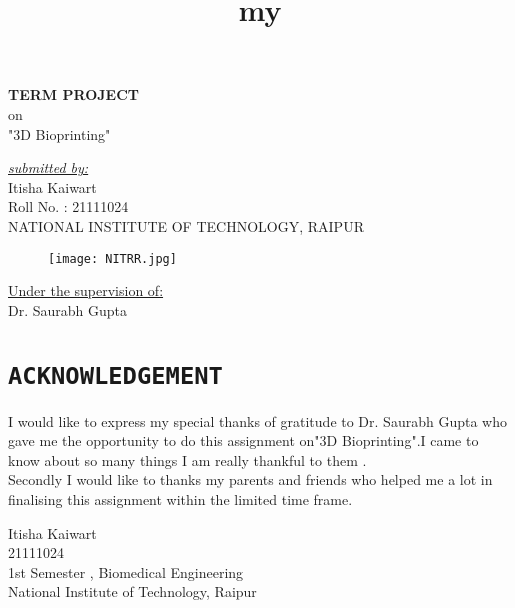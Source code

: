 \documentclass[11pt]{article}
\title{my}
\begin{document}
\centering
\huge\textbf{TERM PROJECT}\\
on\\
\Huge"3D Bioprinting"
\

\emph{\large \underline{ submitted by:}}\\
\large Itisha Kaiwart\\
\large Roll No. : 21111024\\

\vspace{0.9cm}
\centering\Large\textsc{NATIONAL INSTITUTE OF TECHNOLOGY, RAIPUR}\\

\begin{figure}[h]
\centering
\texttt{[image: NITRR.jpg]}
\end{figure}

\large \underline{ Under the supervision of:}\\
Dr. Saurabh Gupta


\pagebreak

\tableofcontents
\pagebreak

\section{\Large\centering\texttt{ACKNOWLEDGEMENT}}

\large \flushleft I would like to express my special thanks of gratitude to Dr. Saurabh Gupta who gave me the opportunity to do this assignment on"3D Bioprinting".I came to know about so many things I am really thankful to them .\\



\vspace{1cm}
Secondly I would like to thanks my parents and friends who helped me a lot in finalising this assignment within the limited time frame.

\vspace{3cm}

\hfill
\begin{minipage}[t]{9cm}
\begin{flushright}
Itisha Kaiwart \\
21111024\\
1st Semester , Biomedical Engineering\\
National Institute of Technology, Raipur\\
\end{flushright}
\end{minipage}
\end{document}
